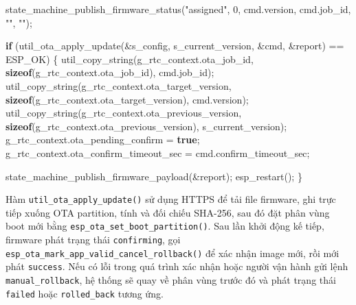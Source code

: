 \documentclass[13pt,a4paper]{extarticle}
\newenvironment{Shaded}{}{}
\newcommand{\ControlFlowTok}[1]{\textcolor[rgb]{0.00,0.44,0.13}{\textbf{#1}}}
\newcommand{\DecValTok}[1]{\textcolor[rgb]{0.25,0.63,0.44}{#1}}
\newcommand{\KeywordTok}[1]{\textcolor[rgb]{0.00,0.44,0.13}{\textbf{#1}}}
\newcommand{\NormalTok}[1]{#1}
\newcommand{\OperatorTok}[1]{\textcolor[rgb]{0.40,0.40,0.40}{#1}}
\newcommand{\StringTok}[1]{\textcolor[rgb]{0.25,0.44,0.63}{#1}}
\renewcommand{\\}{\thesislongtableorignewline\hline}%
\begin{document}
\begin{Shaded}
\begin{Highlighting}[]
\NormalTok{state\_machine\_publish\_firmware\_status}\OperatorTok{(}\StringTok{"assigned"}\OperatorTok{,} \DecValTok{0}\OperatorTok{,}\NormalTok{ cmd}\OperatorTok{.}\NormalTok{version}\OperatorTok{,}\NormalTok{ cmd}\OperatorTok{.}\NormalTok{job\_id}\OperatorTok{,} \StringTok{""}\OperatorTok{,} \StringTok{""}\OperatorTok{);}

\ControlFlowTok{if} \OperatorTok{(}\NormalTok{util\_ota\_apply\_update}\OperatorTok{(\&}\NormalTok{s\_config}\OperatorTok{,}\NormalTok{ s\_current\_version}\OperatorTok{,} \OperatorTok{\&}\NormalTok{cmd}\OperatorTok{,} \OperatorTok{\&}\NormalTok{report}\OperatorTok{)} \OperatorTok{==}\NormalTok{ ESP\_OK}\OperatorTok{)} \OperatorTok{\{}
\NormalTok{    util\_copy\_string}\OperatorTok{(}\NormalTok{g\_rtc\_context}\OperatorTok{.}\NormalTok{ota\_job\_id}\OperatorTok{,} \KeywordTok{sizeof}\OperatorTok{(}\NormalTok{g\_rtc\_context}\OperatorTok{.}\NormalTok{ota\_job\_id}\OperatorTok{),}\NormalTok{ cmd}\OperatorTok{.}\NormalTok{job\_id}\OperatorTok{);}
\NormalTok{    util\_copy\_string}\OperatorTok{(}\NormalTok{g\_rtc\_context}\OperatorTok{.}\NormalTok{ota\_target\_version}\OperatorTok{,} \KeywordTok{sizeof}\OperatorTok{(}\NormalTok{g\_rtc\_context}\OperatorTok{.}\NormalTok{ota\_target\_version}\OperatorTok{),}\NormalTok{ cmd}\OperatorTok{.}\NormalTok{version}\OperatorTok{);}
\NormalTok{    util\_copy\_string}\OperatorTok{(}\NormalTok{g\_rtc\_context}\OperatorTok{.}\NormalTok{ota\_previous\_version}\OperatorTok{,} \KeywordTok{sizeof}\OperatorTok{(}\NormalTok{g\_rtc\_context}\OperatorTok{.}\NormalTok{ota\_previous\_version}\OperatorTok{),}\NormalTok{ s\_current\_version}\OperatorTok{);}
\NormalTok{    g\_rtc\_context}\OperatorTok{.}\NormalTok{ota\_pending\_confirm }\OperatorTok{=} \KeywordTok{true}\OperatorTok{;}
\NormalTok{    g\_rtc\_context}\OperatorTok{.}\NormalTok{ota\_confirm\_timeout\_sec }\OperatorTok{=}\NormalTok{ cmd}\OperatorTok{.}\NormalTok{confirm\_timeout\_sec}\OperatorTok{;}

\NormalTok{    state\_machine\_publish\_firmware\_payload}\OperatorTok{(\&}\NormalTok{report}\OperatorTok{);}
\NormalTok{    esp\_restart}\OperatorTok{();}
\OperatorTok{\}}
\end{Highlighting}
\end{Shaded}

Hàm \texttt{util\_ota\_apply\_update()} sử dụng HTTPS để tải file
firmware, ghi trực tiếp xuống OTA partition, tính và đối chiếu SHA-256,
sau đó đặt phân vùng boot mới bằng
\texttt{esp\_ota\_set\_boot\_partition()}. Sau lần khởi động kế tiếp,
firmware phát trạng thái \texttt{confirming}, gọi
\texttt{esp\_ota\_mark\_app\_valid\_cancel\_rollback()} để xác nhận
image mới, rồi mới phát \texttt{success}. Nếu có lỗi trong quá trình xác
nhận hoặc người vận hành gửi lệnh \texttt{manual\_rollback}, hệ thống sẽ
quay về phân vùng trước đó và phát trạng thái \texttt{failed} hoặc
\texttt{rolled\_back} tương ứng.
\end{document}
